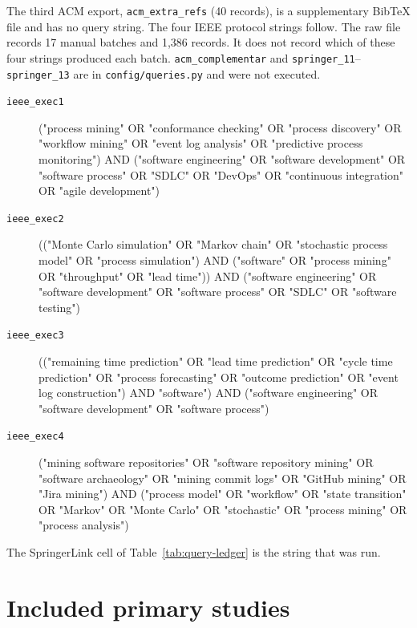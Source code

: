 The third ACM export, \texttt{acm\_extra\_refs} (40 records), is a
supplementary Bib\TeX{} file and has no query string.
The four IEEE protocol strings follow. The raw file records
17 manual batches and 1{,}386 records. It does not record which of these
four strings produced each batch. \texttt{acm\_complementar} and
\texttt{springer\_11}--\texttt{springer\_13} are in
\texttt{config/queries.py} and were not executed.

\begin{description}
\item[\texttt{ieee\_exec1}]{\footnotesize\ttfamily\raggedright
("process mining" OR "conformance checking" OR "process discovery" OR "workflow mining" OR "event log analysis" OR "predictive process monitoring") AND ("software engineering" OR "software development" OR "software process" OR "SDLC" OR "DevOps" OR "continuous integration" OR "agile development")\par}

\item[\texttt{ieee\_exec2}]{\footnotesize\ttfamily\raggedright
(("Monte Carlo simulation" OR "Markov chain" OR "stochastic process model" OR "process simulation") AND ("software" OR "process mining" OR "throughput" OR "lead time")) AND ("software engineering" OR "software development" OR "software process" OR "SDLC" OR "software testing")\par}

\item[\texttt{ieee\_exec3}]{\footnotesize\ttfamily\raggedright
(("remaining time prediction" OR "lead time prediction" OR "cycle time prediction" OR "process forecasting" OR "outcome prediction" OR "event log construction") AND "software") AND ("software engineering" OR "software development" OR "software process")\par}

\item[\texttt{ieee\_exec4}]{\footnotesize\ttfamily\raggedright
("mining software repositories" OR "software repository mining" OR "software archaeology" OR "mining commit logs" OR "GitHub mining" OR "Jira mining") AND ("process model" OR "workflow" OR "state transition" OR "Markov" OR "Monte Carlo" OR "stochastic" OR "process mining" OR "process analysis")\par}
\end{description}

The SpringerLink cell of Table~\ref{tab:query-ledger} is the string that was run.

\section{Included primary studies}
\label{app:included}

